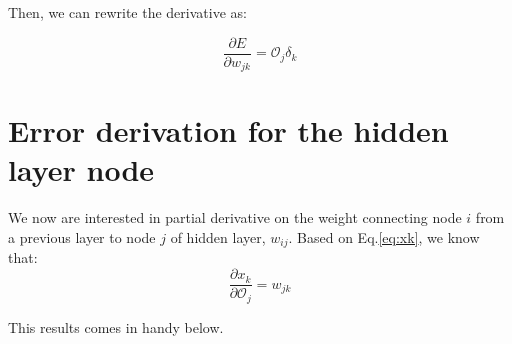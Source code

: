 \documentclass[11pt]{article}
\begin{document}
Then, we can rewrite the derivative as:

\begin{equation}
\frac{\partial E}{\partial w_{jk}} = \mathcal{O}_j \delta_k
\end{equation}


\section{Error derivation for the hidden layer node}

We now are interested in partial derivative on the weight connecting node $i$ from a previous layer to node $j$ of hidden layer, $w_{ij}$. Based on Eq.\ref{eq:xk}, we know that:
\begin{equation}
\label{eq:xk_prime}
\frac{\partial x_k}{\partial \mathcal{O}_j} = w_{jk}
\end{equation}

This results comes in handy below.
\end{document}
